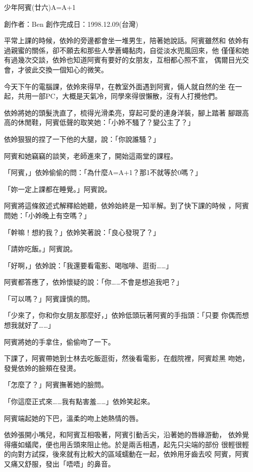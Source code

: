 



少年阿賓(廿六)A=A+1

創作者：Ben
創作完成日：1998.12.09(台灣)


平常上課的時候，依姈的旁邊都會坐一堆男生，陪著她說話。阿賓雖然和
依姈有過親蜜的關係，卻不願去和那些人學蒼蠅黏肉，自從淡水兜風回來，他
僅僅和她有過幾次交談，依姈也知道阿賓有要好的女朋友，互相都心照不宣，
偶爾目光交會，才彼此交換一個知心的微笑。

今天下午的電腦課，依姈來得早，在教室外面遇到阿賓，倆人就自然的坐
在一起，共用一部PC，大概是天氣冷，同學來得很懶散，沒有人打攪他們。

依姈將她的頭髮洗直了，梳得光滑柔亮，穿起可愛的連身洋裝，腳上踏著
腳跟高高的休閒鞋，阿賓低聲的取笑她：「小姈不騷了？變公主了？」

依姈狠狠的捏了一下他的大腿，說：「你說誰騷？」

阿賓和她竊竊的談笑，老師進來了，開始這兩堂的課程。

「阿賓，」依姈偷偷的問：「為什麼A=A+1？那1不就等於0嗎？」

「妳一定上課都在睡覺。」阿賓說。

阿賓將這條敘述式解釋給她聽，依姈始終是一知半解。到了快下課的時候
，阿賓問她：「小姈晚上有空嗎？」

「幹嘛！想約我？」依姈笑著說：「良心發現了？」

「請妳吃飯。」阿賓說。

「好啊，」依姈說：「我還要看電影、喝咖啡、逛街……」

阿賓都答應了，依姈懷疑的說：「你……不會是想追我吧？」

「可以嗎？」阿賓謹慎的問。

「少來了，你和你女朋友那麼好，」依姈低頭玩著阿賓的手指頭：「只要
你偶而想想我就好了……」

阿賓將她的手拿住，偷偷吻了一下。

下課了，阿賓帶她到士林去吃飯逛街，然後看電影，在戲院裡，阿賓趁黑
吻她，發覺依姈的臉頰在發燙。

「怎麼了？」阿賓撫著她的臉問。

「你這麼正式來……我有點害羞……」依姈笑起來。

阿賓端起她的下巴，溫柔的吻上她熱情的唇。

依姈張開小嘴兒，和阿賓互相吸著，阿賓引動舌尖，沿著她的唇緣游動，
依姈覺得癢如蟻爬，便也用舌頭來阻止他。於是兩舌相遇，起先只尖端的部份
很輕很輕的向對方試探，後來就有比較大的區域蠕動在一起，依姈用牙齒去咬
阿賓，阿賓又痛又舒服，發出「唔唔」的鼻音。

